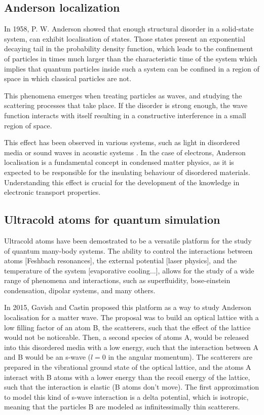 \subsection{Anderson localization}

In 1958, P. W. Anderson \cite{andersonAbsenceDiffusionCertain1958} showed that enough structural disorder in a solid-state system, can exhibit localisation of states. Those states present an exponential decaying tail in the probability density function, which leads to the confinement of particles in times much larger than the characteristic time of the system which implies that quantum particles inside such a system can be confined in a region of space in which classical particles are not.

This phenomena emerges when treating particles as waves, and studying the scattering processes that take place. If the disorder is strong enough, the wave function interacts with itself resulting in a constructive interference in a small region of space.

This effect has been observed in various systems, such as light in disordered media \cite{wiersma_localization_1997} or sound waves in acoustic systems \cite{hu_localization_2018}. In the case of electrons, Anderson localisation is a fundamental concept in condensed matter physics, as it is expected to be responsible for the insulating behaviour of disordered materials. Understanding this effect is crucial for the development of the knowledge in electronic transport properties.


\subsection{Ultracold atoms for quantum simulation}

Ultracold atoms have been demostrated to be a versatile platform for the study of quantum many-body systems. The ability to control the interactions between atoms [Feshbach resonances], the external potential [laser physics], and the temperature of the system [evaporative cooling...], allows for the study of a wide range of phenomena and interactions, such as superfluidity, bose-einstein condensation, dipolar systems, and many others.

In 2015, Gavish and Castin \cite{gavishMatterwave2005} proposed this platform as a way to study Anderson localisation for a matter wave. The proposal was to build an optical lattice with a low filling factor of an atom B, the scatterers, such that the effect of the lattice would not be noticeable. Then, a second species of atoms A, would be released into this disordered media with a low energy, such that the interaction between A and B would be an s-wave ($l=0$ in the angular momentum). The scatterers are prepared in the vibrational ground state of the optical lattice, and the atoms A interact with B atoms with a lower energy than the recoil energy of the lattice, such that the interaction is elastic (B atoms don't move). The first approximation to model this kind of s-wave interaction is a delta potential, which is isotropic, meaning that the particles B are modeled as infinitessimally thin scatterers.

